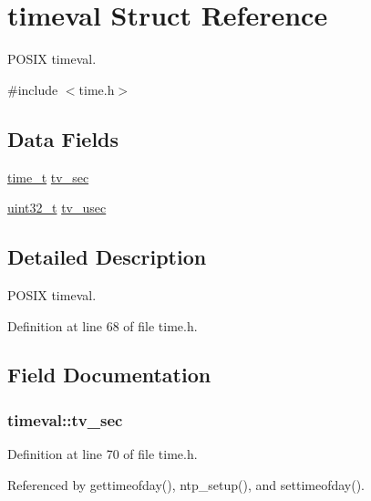 \hypertarget{structtimeval}{}\section{timeval Struct Reference}
\label{structtimeval}


P\+O\+S\+IX timeval.  




{\ttfamily \#include $<$time.\+h$>$}

\subsection*{Data Fields}
\begin{DoxyCompactItemize}
\item 
\hyperlink{time_8h_a3346b04b0420b32ccf6b706551b70762}{time\+\_\+t} \hyperlink{structtimeval_aef6ddab1064c430758f9f913b7e4a21e}{tv\+\_\+sec}
\item 
\hyperlink{send_8c_a435d1572bf3f880d55459d9805097f62}{uint32\+\_\+t} \hyperlink{structtimeval_a8fd7abf5420981b3ff58bb23df458587}{tv\+\_\+usec}
\end{DoxyCompactItemize}


\subsection{Detailed Description}
P\+O\+S\+IX timeval. 

Definition at line 68 of file time.\+h.



\subsection{Field Documentation}
\subsubsection[{\texorpdfstring{tv\+\_\+sec}{tv_sec}}]{ timeval\+::tv\+\_\+sec}\hypertarget{structtimeval_aef6ddab1064c430758f9f913b7e4a21e}{}\label{structtimeval_aef6ddab1064c430758f9f913b7e4a21e}


Definition at line 70 of file time.\+h.



Referenced by gettimeofday(), ntp\+\_\+setup(), and settimeofday().

